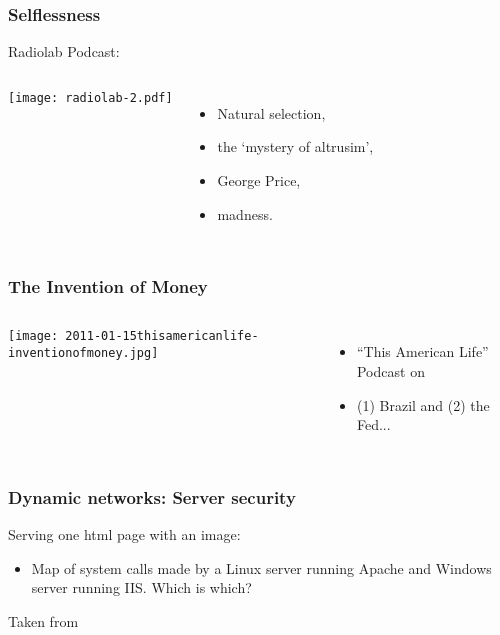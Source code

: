 \begin{frame}
  \frametitle{Selflessness}

  Radiolab Podcast: 
  \bigskip
  \begin{columns}
    \texttt{[image: radiolab-2.pdf]}
    \begin{itemize}
    \item 
      Natural selection, 
    \item 
      the `mystery of altrusim', 
    \item 
      George Price, 
    \item 
      madness.
    \end{itemize}
  \end{columns}

\end{frame}

\begin{frame}
  \frametitle{The Invention of Money}

  \begin{columns}
    \texttt{[image: 2011-01-15thisamericanlife-inventionofmoney.jpg]}
    \begin{itemize}
    \item 
      ``This American Life''
      Podcast on 
    \item 
      (1) Brazil and (2) the Fed...
    \end{itemize}
  \end{columns}

\end{frame}


\begin{frame}
  \frametitle{Dynamic networks: Server security}

  \begin{block}{Serving one html page with an image:}
    \bigskip
    \setlength\fboxsep{0pt}
    \setlength\fboxrule{1pt}
    \begin{itemize}
    \item 
      Map of system calls made by a Linux server running Apache and
      Windows server running IIS.  Which is which?
    \end{itemize}
  \end{block}
  {\tiny
  Taken from }
  
\end{frame}

